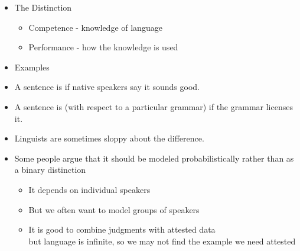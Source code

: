 \documentclass[a4paper,landscape,headrule,footrule]{foils}
\begin{document}
\begin{itemize}
\item The Distinction
\begin{itemize}
\item Competence - knowledge of language
\item Performance - how the knowledge is used
\end{itemize}
\item Examples
\begin{exe}
\ex  {}
\ex  {}
\ex  {}
\ex  {}
\end{exe}
\end{itemize}


\begin{exe}
\ex  {}
\ex  {}
\ex  {}
\end{exe}


\begin{itemize}
\item A sentence is  if native speakers
say it sounds good.

\item A sentence is  (with respect to
a particular grammar) if the grammar
licenses it.

\item Linguists are sometimes sloppy about the
difference.

\item Some people argue that it should be modeled probabilistically
  rather than as a binary distinction
  \begin{itemize}
  \item It depends on individual speakers
  \item But we often want to model groups of speakers
  \item It is good to combine judgments with attested data
    \\ but language is infinite, so we may not find the example we need attested
  \end{itemize}
\end{itemize}
\end{document}
